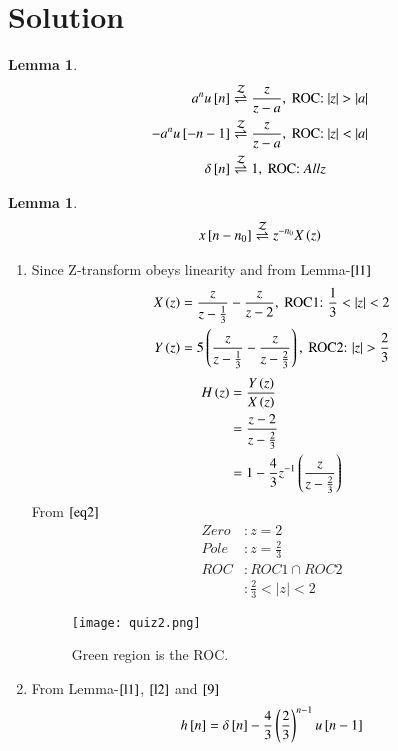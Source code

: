 \documentclass[journal,12pt,twocolumn]{IEEEtran}
\newtheorem{lemma}[theorem]{Lemma}
\begin{document}
\section{Solution}
\begin{lemma}\label{l1}
\begin{align}
    a^n u\sbrak{n} &\zee \frac{z}{z-a}, \text{ ROC: }|z|>|a|\\
    -a^n u\sbrak{-n-1} &\zee \frac{z}{z-a}, \text{ ROC: }|z|<|a|\\
    \delta\sbrak{n}&\zee 1, \text{ ROC: }All z
\end{align}
\end{lemma}
\begin{lemma}\label{l2}
\begin{align}
    x{}\left[n-n_0\right] \overset{\mathcal{Z}}{ \rightleftharpoons} z^{-n_0}X\left(z\right)
\end{align}
\end{lemma}
\begin{enumerate}
\item Since Z-transform obeys linearity and from Lemma-$\ref{l1}$ 
\begin{align}
    X\brak{z}&=\frac{z}{z-\frac{1}{3}}-\frac{z}{z-2}, \text{ ROC1: } \frac{1}{3}<|z|<2\\
    Y\brak{z}&=5\brak{\frac{z}{z-\frac{1}{3}}-\frac{z}{z-\frac{2}{3}}},\text{ ROC2: } |z|>\frac{2}{3}
\end{align}
\begin{align}
    H\left(z\right)&=\frac{Y\left(z\right)}{X\left(z\right)}\\
    &=\frac{z-2}{z-\frac{2}{3}}\label{eq2}\\
    &=1 - \frac{4}{3}z^{-1}\left(\frac{z}{z-\frac{2}{3}}\right)\label{9}
\end{align}
From $\eqref{eq2}$ 
\begin{align}
    Zero &: z=2\\
    Pole &: z=\frac{2}{3}\\
    ROC &: ROC1\cap ROC2\\
    &: \frac{2}{3}<|z|<2
\end{align}
\begin{figure}[!h]
 \centering
 \texttt{[image: quiz2.png]}
 \caption{Green region is the ROC.}
\end{figure}
\item From Lemma-$\ref{l1}$, $\ref{l2}$ and $\eqref{9}$ 
\begin{align}
    h{}\left[n\right]=\delta{}\left[n\right]-\frac{4}{3}\left(\frac{2}{3}\right)^{n-1}u{}\left[n-1\right]
\end{align}
\end{enumerate}
\end{document}
